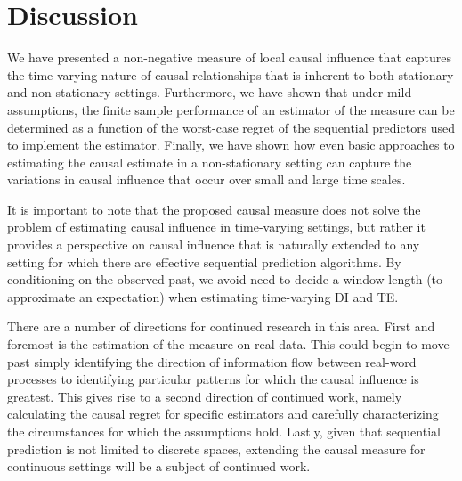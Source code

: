 \section{Discussion} \label{discussion}

We have presented a non-negative measure of local causal influence that captures the time-varying nature of causal relationships that is inherent to both stationary and non-stationary settings. Furthermore, we have shown that under mild assumptions, the finite sample performance of an estimator of the measure can be determined as a function of the worst-case regret of the sequential predictors used to implement the estimator. Finally, we have shown how even basic approaches to estimating the causal estimate in a non-stationary setting can capture the variations in causal influence that occur over small and large time scales.

It is important to note that the proposed causal measure does not solve the problem of estimating causal influence in time-varying settings, but rather it provides a perspective on causal influence that is naturally extended to any setting for which there are effective sequential prediction algorithms. By conditioning on the observed past, we avoid need to decide a window length (to approximate an expectation) when estimating time-varying DI and TE.

There are a number of directions for continued research in this area. First and foremost is the estimation of the measure on real data. This could begin to move past simply identifying the direction of information flow between real-word processes to identifying particular patterns for which the causal influence is greatest. This gives rise to a second direction of continued work, namely calculating the causal regret for specific estimators and carefully characterizing the circumstances for which the assumptions hold. Lastly, given that sequential prediction is not limited to discrete spaces, extending the causal measure for continuous settings will be a subject of continued work.